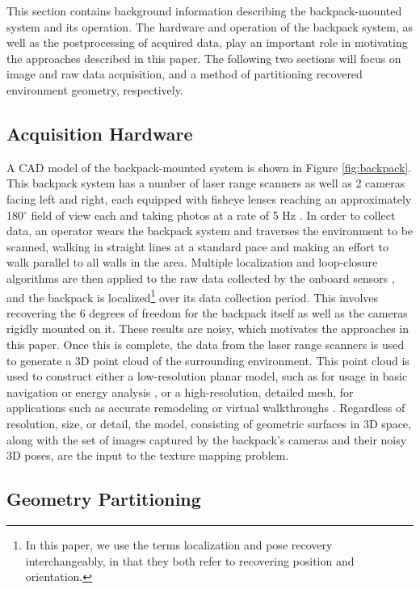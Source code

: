 \documentclass[]{spie}  %
\begin{document}
This section contains background information describing the
backpack-mounted system and its operation. The hardware and operation
of the backpack system, as well as the postprocessing of acquired
data, play an important role in motivating the approaches described in
this paper. The following two sections will focus on image and raw
data acquisition, and a method of partitioning recovered environment
geometry, respectively.

\subsection{Acquisition Hardware}

A CAD model of the backpack-mounted system is shown in Figure
\ref{fig:backpack}. This backpack system has a number of laser range
scanners as well as 2 cameras facing left and right, each equipped
with fisheye lenses reaching an approximately 180$^{\circ}$ field of
view each and taking photos at a rate of 5 Hz \cite{liu2010indoor}. In
order to collect data, an operator wears the backpack system and
traverses the environment to be scanned, walking in straight lines at
a standard pace and making an effort to walk parallel to all walls in
the area. Multiple localization and loop-closure algorithms are then
applied to the raw data collected by the onboard sensors
\cite{chen2010indoor, kua2012loopclosure, liu2010indoor}, and the
backpack is localized\footnote{In this paper, we use the terms
  localization and pose recovery interchangeably, in that they both
  refer to recovering position and orientation.}  over its data
collection period. This involves recovering the 6 degrees of freedom
for the backpack itself as well as the cameras rigidly mounted on it.
These results are noisy, which motivates the approaches in this
paper. Once this is complete, the data from the laser range scanners
is used to generate a 3D point cloud of the surrounding
environment. This point cloud is used to construct either a
low-resolution planar model, such as for usage in basic navigation or
energy analysis \cite{sanchez2012point, turnerfloorplan}, or a
high-resolution, detailed mesh, for applications such as accurate
remodeling or virtual walkthroughs \cite{turnerwatertight}.
Regardless of resolution, size, or detail, the model, consisting of
geometric surfaces in 3D space, along with the set of images captured
by the backpack's cameras and their noisy 3D poses, are the input to
the texture mapping problem.

\subsection{Geometry Partitioning}
\label{sec:geometryPartitioning}
\end{document}
